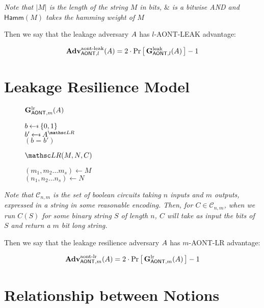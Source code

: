 \documentclass[11pt,twoside]{article}
\begin{document}
\emph{Note that $|M|$ is the length of the string $M$ in bits, $\mathrel{\&}$ is a bitwise AND and $\mathsf{Hamm}(M)$ takes the hamming weight of $M$}

Then we say that the leakage adversary $A$ has $l$-AONT-LEAK advantage: 

$$\textbf{Adv}^\text{aont-leak}_{\mathsf{AONT},l}(A)=2\cdot{\Pr\left[\,{\mathbf{G}_{\mathsf{AONT},l}^\text{leak}(A)}\,\right]} - 1$$

\section{Leakage Resilience Model} 

\begin{figure}[H]
{
\underline{$\mathbf{G}_{\mathsf{AONT},m}^\text{lr}(A)$}

\begin{algorithm}[H]
$b \getsr \bits$\\
$b' \getsr \advA^{\LRO}$\\
\Return $(b=b')$
\end{algorithm}

\smallskip
\underline{$\LRO(M,N,C)$}

\begin{algorithm}[H]
$(m_1,m_2\dots m_s)\gets M$\\
$(n_1,n_2\dots n_s)\gets N$\\
\end{algorithm}
}
\end{figure}

\emph{Note that $\mathcal{C}_{n,m}$ is the set of boolean circuits taking $n$ inputs and $m$ outputs, expressed in a string in some reasonable encoding. Then, for $C\in \mathcal{C}_{n,m}$, when we run $C(S)$ for some binary string $S$ of length $n$, $C$ will take as input the bits of $S$ and return a $m$ bit long string.}

Then we say that the leakage resilience adversary $A$ has $m$-AONT-LR advantage: 

$$\textbf{Adv}^\text{aont-lr}_{\mathsf{AONT},m}(A)=2\cdot{\Pr\left[\,{\mathbf{G}_{\mathsf{AONT},m}^\text{lr}(A)}\,\right]} - 1$$

\section{Relationship between Notions} 
\end{document}
